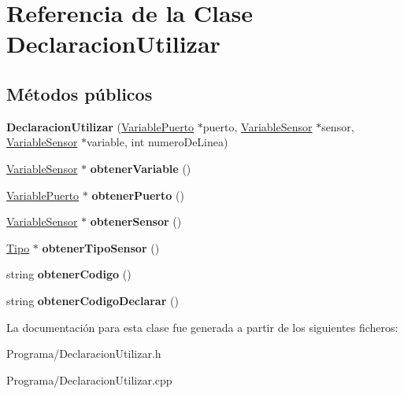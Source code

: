 \hypertarget{class_declaracion_utilizar}{\section{Referencia de la Clase Declaracion\-Utilizar}
\label{class_declaracion_utilizar}
}
\subsection*{Métodos públicos}
\begin{DoxyCompactItemize}
\item 
\hypertarget{class_declaracion_utilizar_a084b243e51c1e8bcc0485347e9921005}{{\bfseries Declaracion\-Utilizar} (\hyperlink{class_variable_puerto}{Variable\-Puerto} $\ast$puerto, \hyperlink{class_variable_sensor}{Variable\-Sensor} $\ast$sensor, \hyperlink{class_variable_sensor}{Variable\-Sensor} $\ast$variable, int numero\-De\-Linea)}\label{class_declaracion_utilizar_a084b243e51c1e8bcc0485347e9921005}

\item 
\hypertarget{class_declaracion_utilizar_a9d02300afd4c6bc2a76cbca50774746e}{\hyperlink{class_variable_sensor}{Variable\-Sensor} $\ast$ {\bfseries obtener\-Variable} ()}\label{class_declaracion_utilizar_a9d02300afd4c6bc2a76cbca50774746e}

\item 
\hypertarget{class_declaracion_utilizar_ac8c806f5592530a8eb2898be86e87ddf}{\hyperlink{class_variable_puerto}{Variable\-Puerto} $\ast$ {\bfseries obtener\-Puerto} ()}\label{class_declaracion_utilizar_ac8c806f5592530a8eb2898be86e87ddf}

\item 
\hypertarget{class_declaracion_utilizar_a38da1aa55dec62b78bac264c97f0c482}{\hyperlink{class_variable_sensor}{Variable\-Sensor} $\ast$ {\bfseries obtener\-Sensor} ()}\label{class_declaracion_utilizar_a38da1aa55dec62b78bac264c97f0c482}

\item 
\hypertarget{class_declaracion_utilizar_a70341530d8b057c61ebd6407161881af}{\hyperlink{class_tipo}{Tipo} $\ast$ {\bfseries obtener\-Tipo\-Sensor} ()}\label{class_declaracion_utilizar_a70341530d8b057c61ebd6407161881af}

\item 
\hypertarget{class_declaracion_utilizar_aa21dc41533e8829a3c6519576411dcb4}{string {\bfseries obtener\-Codigo} ()}\label{class_declaracion_utilizar_aa21dc41533e8829a3c6519576411dcb4}

\item 
\hypertarget{class_declaracion_utilizar_a95d4647f2de3b2f0a92530e5ada143e2}{string {\bfseries obtener\-Codigo\-Declarar} ()}\label{class_declaracion_utilizar_a95d4647f2de3b2f0a92530e5ada143e2}

\end{DoxyCompactItemize}


La documentación para esta clase fue generada a partir de los siguientes ficheros\-:\begin{DoxyCompactItemize}
\item 
Programa/Declaracion\-Utilizar.\-h\item 
Programa/Declaracion\-Utilizar.\-cpp\end{DoxyCompactItemize}
